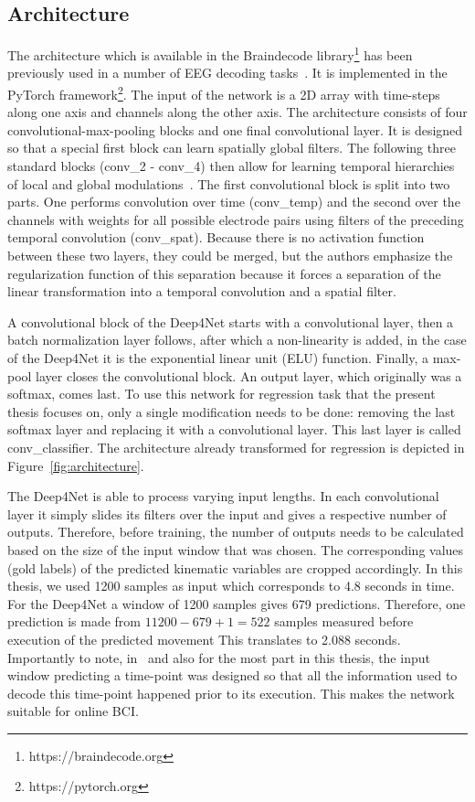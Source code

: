 \subsection{Architecture}\label{subsec:architecture}
The architecture which is available in the Braindecode library\footnote{https://braindecode.org} has been previously used in a number of EEG decoding tasks~\cite{Hammer-2021, schirrmeister-deep-2017, hartmann-hierarchical-2018}.
It is implemented in the PyTorch framework\footnote{https://pytorch.org}.
The input of the network is a 2D array with time-steps along one axis and channels along the other axis.
The architecture consists of four convolutional-max-pooling blocks and one final convolutional layer.
It is designed so that a special first block can learn spatially global filters.
The following three standard blocks (conv\_2 - conv\_4) then allow for learning temporal hierarchies of local and global modulations~\cite{schirrmeister-deep-2017}.
The first convolutional block is split into two parts.
One performs convolution over time (conv\_temp) and the second over the channels with weights for all possible electrode pairs using filters of the preceding temporal convolution (conv\_spat).
Because there is no activation function between these two layers, they could be merged, but the authors emphasize the regularization function of this separation because it forces a separation of the linear transformation into a temporal convolution and a spatial filter.

A convolutional block of the Deep4Net starts with a convolutional layer, then a batch normalization layer follows, after which a non-linearity is added, in the case of the Deep4Net it is the exponential linear unit (ELU) function.
Finally, a max-pool layer closes the convolutional block.
An output layer, which originally was a softmax, comes last.
To use this network for regression task that the present thesis focuses on, only a single modification needs to be done: removing the last softmax layer and replacing it with a convolutional layer.
This last layer is called conv\_classifier.
The architecture already transformed for regression is depicted in Figure~\ref{fig:architecture}.

The Deep4Net is able to process varying input lengths.
In each convolutional layer it simply slides its filters over the input and gives a respective number of outputs.
Therefore, before training, the number of outputs needs to be calculated based on the size of the input window that was chosen.
The corresponding values (gold labels) of the predicted kinematic variables are cropped accordingly.
In this thesis, we used 1200 samples as input which corresponds to 4.8 seconds in time.
For the Deep4Net a window of 1200 samples gives 679 predictions.
Therefore, one prediction is made from $11200 - 679 + 1 = 522 $ samples measured before execution of the predicted movement
This translates to 2.088 seconds.
Importantly to note, in~\cite{Hammer-2021} and also for the most part in this thesis, the input window predicting a time-point was designed so that all the information used to decode this time-point happened prior to its execution.
This makes the network suitable for online BCI\@. \\

